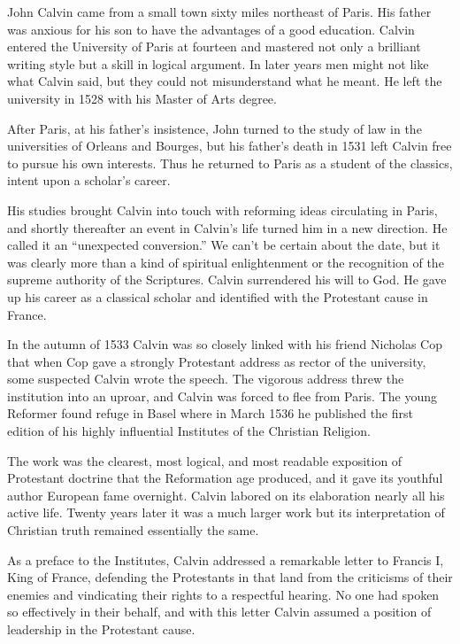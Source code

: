 John Calvin came from a small town sixty miles northeast of Paris. His father was anxious for his
son to have the advantages of a good education. Calvin entered the University of Paris at fourteen
and mastered not only a brilliant writing style but a skill in logical argument. In later years men
might not like what Calvin said, but they could not misunderstand what he meant. He left the
university in 1528 with his Master of Arts degree.

After Paris, at his father’s insistence, John turned to the study of law in the universities of
Orleans and Bourges, but his father’s death in 1531 left Calvin free to pursue his own interests.
Thus he returned to Paris as a student of the classics, intent upon a scholar’s career.

His studies brought Calvin into touch with reforming ideas circulating in Paris, and shortly
thereafter an event in Calvin’s life turned him in a new direction. He called it an “unexpected
conversion.” We can’t be certain about the date, but it was clearly more than a kind of spiritual
enlightenment or the recognition of the supreme authority of the Scriptures. Calvin surrendered his
will to God. He gave up his career as a classical scholar and identified with the Protestant cause
in France.

In the autumn of 1533 Calvin was so closely linked with his friend Nicholas Cop that when Cop gave a
strongly Protestant address as rector of the university, some suspected Calvin wrote the speech. The
vigorous address threw the institution into an uproar, and Calvin was forced to flee from Paris. The
young Reformer found refuge in Basel where in March 1536 he published the first edition of his
highly influential Institutes of the Christian Religion.

The work was the clearest, most logical, and most readable exposition of Protestant doctrine that
the Reformation age produced, and it gave its youthful author European fame overnight. Calvin
labored on its elaboration nearly all his active life. Twenty years later it was a much larger work
but its interpretation of Christian truth remained essentially the same.

As a preface to the Institutes, Calvin addressed a remarkable letter to Francis I, King of France,
defending the Protestants in that land from the criticisms of their enemies and vindicating their
rights to a respectful hearing. No one had spoken so effectively in their behalf, and with this
letter Calvin assumed a position of leadership in the Protestant cause.


